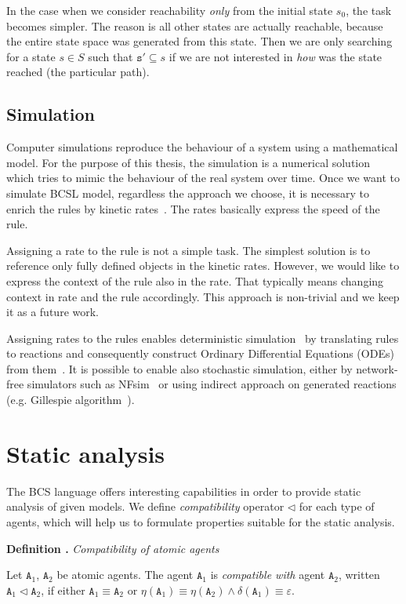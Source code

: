 \documentclass[12pt, twoside]{fithesis2} %
\newcounter{counter}[section]
\renewcommand{\thecounter}{\thesection.\arabic{counter}}
\newenvironment{definition}[1]{\bigskip\refstepcounter{counter}\noindent\textbf{Definition \thecounter } \emph{#1} \par\nopagebreak \begin{itshape}}{\end{itshape}\bigskip}
\begin{document}
In the case when we consider reachability \emph{only} from the initial state $s_0$, the task becomes simpler. The reason is all other states are actually reachable, because the entire state space was generated from this state. Then we are only searching for a state $s \in S$ such that $\mathtt{s}' \subseteq s$ if we are not interested in \emph{how} was the state reached (the particular path).

\subsection{Simulation}
\label{simulation}

Computer simulations reproduce the behaviour of a system using a mathematical model. For the purpose of this thesis, the simulation is a numerical solution which tries to mimic the behaviour of the real system over time. Once we want to simulate BCSL model, regardless the approach we choose, it is necessary to enrich the rules by kinetic rates~\cite{mcnaught1997compendium}. The rates basically express the speed of the rule.

Assigning a rate to the rule is not a simple task. The simplest solution is to reference only fully defined objects in the kinetic rates. However, we would like to express the context of the rule also in the rate. That typically means changing context in rate and the rule accordingly. This approach is non-trivial and we keep it as a future work.

Assigning rates to the rules enables deterministic simulation~\cite{Poole2000} by translating rules to reactions and consequently construct Ordinary Differential Equations (ODEs) from them~\cite{higham2008modeling}. It is possible to enable also stochastic simulation, either by network-free simulators such as NFsim~\cite{sneddon2011efficient} or using indirect approach on generated reactions (e.g. Gillespie algorithm~\cite{GILLESPIE1976403}).

\section{Static analysis}
\label{static_analyses}

The BCS language offers interesting capabilities in order to provide static analysis of given models. We define \emph{compatibility} operator $\lhd$ for each type of agents, which will help us to formulate properties suitable for the static analysis.

\begin{definition}{Compatibility of atomic agents}
Let $\mathtt{A}_1$, $\mathtt{A}_2$ be atomic agents. The agent $\mathtt{A}_1$ is \emph{compatible with} agent $\mathtt{A}_2$, written $\mathtt{A}_1 \lhd \mathtt{A}_2$, if either $\mathtt{A}_1 \equiv \mathtt{A}_2$ or $\eta(\mathtt{A}_1) \equiv \eta(\mathtt{A}_2) \wedge \delta(\mathtt{A}_1) \equiv \varepsilon $.
\end{definition}
\end{document}
